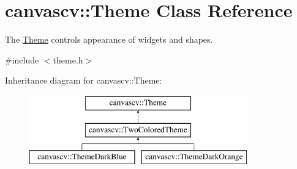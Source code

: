 \hypertarget{classcanvascv_1_1Theme}{}\section{canvascv\+:\+:Theme Class Reference}
\label{classcanvascv_1_1Theme}


The \hyperlink{classcanvascv_1_1Theme}{Theme} controls appearance of widgets and shapes.  




{\ttfamily \#include $<$theme.\+h$>$}

Inheritance diagram for canvascv\+:\+:Theme\+:\begin{figure}[H]
\begin{center}
\leavevmode
\includegraphics[height=3.000000cm]{classcanvascv_1_1Theme}
\end{center}
\end{figure}
